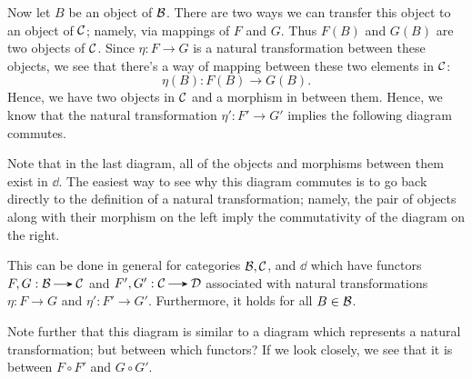     Now let $B$ be an object of $\mathcal{B}$. There are two ways we can
    transfer this object to an object of $\mathcal{C}$; namely, via mappings
    of $F$ and $G$. Thus $F(B)$ and $G(B)$ are two objects of $\mathcal{C}$.
    Since $\eta: F \to G$ is a natural transformation between these
    objects, we see that there's a way of mapping between these two
    elements in $\mathcal{C}$:
    \[
        \eta(B): F(B) \to G(B).
    \]     
    Hence, we have two objects in $\mathcal{C}$ and a morphism in between
    them. Hence, we know that the natural transformation $\eta': F'
    \to G'$ implies the following diagram commutes. 
    \begin{center}
        \hspace{2cm}
    \end{center}
    Note that in the last diagram, all of the objects and morphisms
    between them exist in $\dd$. The easiest way to see why this
    diagram commutes is to go back directly to the definition of a
    natural transformation; namely, the pair of objects along with
    their morphism on the left imply the commutativity of the diagram
    on the right. 

    This can be done in general for categories $\mathcal{B}, \mathcal{C}$, and $\dd$
    which have functors $F, G:\bb \to \cc$ and $F', G': \cc \to \dd$
    associated with natural transformations $\eta: F \to G$ and
    $\eta': F' \to G'$. Furthermore, it holds for all $B \in \mathcal{B}$.

    Note further that this diagram is similar to a diagram which represents a natural
    transformation; but between which functors? If we look closely, we
    see that it is
    between $F\circ F'$ and $G \circ G'$. 

